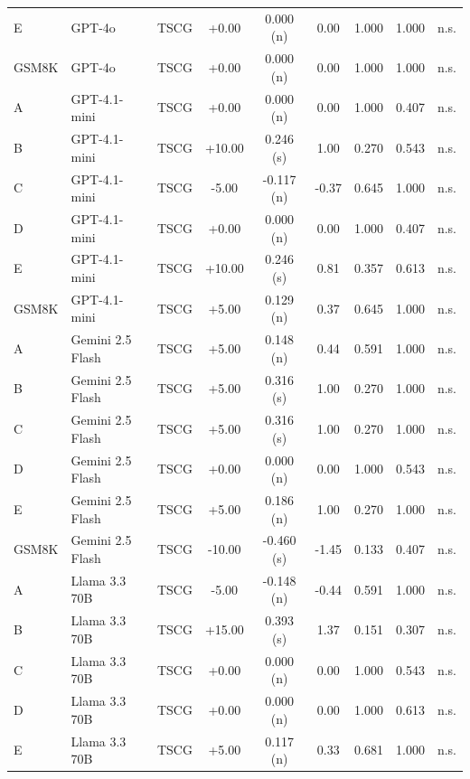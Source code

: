 \begin{table}[htbp]
\begin{tabular}{llccccccc}
    \addlinespace
    E & GPT-4o & TSCG & +0.00 & 0.000 (n) & 0.00 & 1.000 & 1.000 & n.s. \\
    \addlinespace
    GSM8K & GPT-4o & TSCG & +0.00 & 0.000 (n) & 0.00 & 1.000 & 1.000 & n.s. \\
    \addlinespace
    A & GPT-4.1-mini & TSCG & +0.00 & 0.000 (n) & 0.00 & 1.000 & 0.407 & n.s. \\
    \addlinespace
    B & GPT-4.1-mini & TSCG & +10.00 & 0.246 (s) & 1.00 & 0.270 & 0.543 & n.s. \\
    \addlinespace
    C & GPT-4.1-mini & TSCG & -5.00 & -0.117 (n) & -0.37 & 0.645 & 1.000 & n.s. \\
    \addlinespace
    D & GPT-4.1-mini & TSCG & +0.00 & 0.000 (n) & 0.00 & 1.000 & 0.407 & n.s. \\
    \addlinespace
    E & GPT-4.1-mini & TSCG & +10.00 & 0.246 (s) & 0.81 & 0.357 & 0.613 & n.s. \\
    \addlinespace
    GSM8K & GPT-4.1-mini & TSCG & +5.00 & 0.129 (n) & 0.37 & 0.645 & 1.000 & n.s. \\
    \addlinespace
    A & Gemini 2.5 Flash & TSCG & +5.00 & 0.148 (n) & 0.44 & 0.591 & 1.000 & n.s. \\
    \addlinespace
    B & Gemini 2.5 Flash & TSCG & +5.00 & 0.316 (s) & 1.00 & 0.270 & 1.000 & n.s. \\
    \addlinespace
    C & Gemini 2.5 Flash & TSCG & +5.00 & 0.316 (s) & 1.00 & 0.270 & 1.000 & n.s. \\
    \addlinespace
    D & Gemini 2.5 Flash & TSCG & +0.00 & 0.000 (n) & 0.00 & 1.000 & 0.543 & n.s. \\
    \addlinespace
    E & Gemini 2.5 Flash & TSCG & +5.00 & 0.186 (n) & 1.00 & 0.270 & 1.000 & n.s. \\
    \addlinespace
    GSM8K & Gemini 2.5 Flash & TSCG & -10.00 & -0.460 (s) & -1.45 & 0.133 & 0.407 & n.s. \\
    \addlinespace
    A & Llama 3.3 70B & TSCG & -5.00 & -0.148 (n) & -0.44 & 0.591 & 1.000 & n.s. \\
    \addlinespace
    B & Llama 3.3 70B & TSCG & +15.00 & 0.393 (s) & 1.37 & 0.151 & 0.307 & n.s. \\
    \addlinespace
    C & Llama 3.3 70B & TSCG & +0.00 & 0.000 (n) & 0.00 & 1.000 & 0.543 & n.s. \\
    \addlinespace
    D & Llama 3.3 70B & TSCG & +0.00 & 0.000 (n) & 0.00 & 1.000 & 0.613 & n.s. \\
    \addlinespace
    E & Llama 3.3 70B & TSCG & +5.00 & 0.117 (n) & 0.33 & 0.681 & 1.000 & n.s. \\

\end{tabular}
\end{table}
